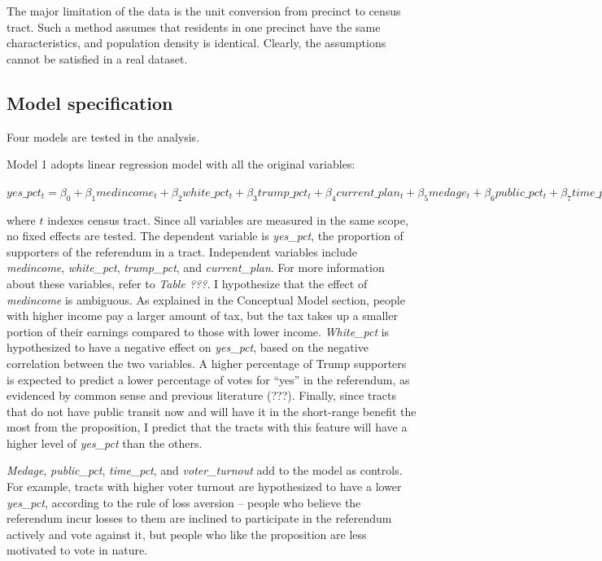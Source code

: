 \documentclass[
]{article}
\begin{document}
The major limitation of the data is the unit conversion from precinct to
census tract. Such a method assumes that residents in one precinct have
the same characteristics, and population density is identical. Clearly,
the assumptions cannot be satisfied in a real dataset.

\hypertarget{model-specification}{%
\subsection{Model specification}\label{model-specification}}

Four models are tested in the analysis.

Model 1 adopts linear regression model with all the original variables:

\(yes\_pct_t = \beta_0+\beta_1medincome_t+\beta_2white\_pct_t+\beta_3trump\_pct_t+\beta_4current\_plan_t+\beta_5medage_t+\beta_6public\_pct_t+\beta_7time\_pct_t+\beta_8voter\_turnout_t+\epsilon_t\)

where \(t\) indexes census tract. Since all variables are measured in
the same scope, no fixed effects are tested. The dependent variable is
\emph{yes\_pct}, the proportion of supporters of the referendum in a
tract. Independent variables include \emph{medincome},
\emph{white\_pct}, \emph{trump\_pct}, and \emph{current\_plan}. For more
information about these variables, refer to \emph{Table ???}. I
hypothesize that the effect of \emph{medincome} is ambiguous. As
explained in the Conceptual Model section, people with higher income pay
a larger amount of tax, but the tax takes up a smaller portion of their
earnings compared to those with lower income. \emph{White\_pct} is
hypothesized to have a negative effect on \emph{yes\_pct}, based on the
negative correlation between the two variables. A higher percentage of
Trump supporters is expected to predict a lower percentage of votes for
``yes'' in the referendum, as evidenced by common sense and previous
literature (???). Finally, since tracts that do not have public transit
now and will have it in the short-range benefit the most from the
proposition, I predict that the tracts with this feature will have a
higher level of \emph{yes\_pct} than the others.

\emph{Medage}, \emph{public\_pct}, \emph{time\_pct}, and
\emph{voter\_turnout} add to the model as controls. For example, tracts
with higher voter turnout are hypothesized to have a lower
\emph{yes\_pct}, according to the rule of loss aversion -- people who
believe the referendum incur losses to them are inclined to participate
in the referendum actively and vote against it, but people who like the
proposition are less motivated to vote in nature.
\end{document}
